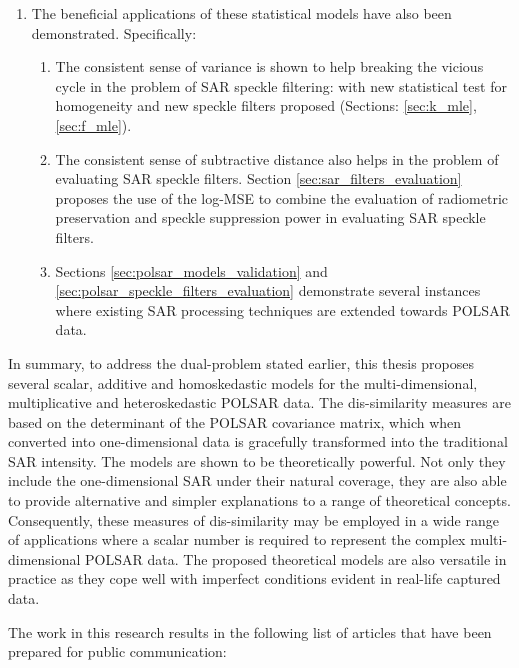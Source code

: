 \begin{enumerate}
\item The beneficial applications of these
                statistical models have also been demonstrated. Specifically:
                \begin{enumerate}
                \item The consistent sense of variance
                is shown to help breaking the vicious cycle in the problem of SAR
                speckle filtering: with new statistical test for
                homogeneity and new speckle filters proposed (Sections: \ref{sec:k_mle}, \ref{sec:f_mle}).
                \item The consistent sense of subtractive
                distance also helps in the problem of evaluating SAR
                speckle filters. Section \ref{sec:sar_filters_evaluation} proposes the use of the log-MSE to combine the
                evaluation of radiometric preservation and speckle
                suppression power in evaluating SAR speckle filters.
                \item  Sections \ref{sec:polsar_models_validation} and \ref{sec:polsar_speckle_filters_evaluation} demonstrate several instances where existing SAR
                processing techniques are extended towards POLSAR data.
                \end{enumerate}
\end{enumerate}

In summary, to address the dual-problem stated earlier, this thesis proposes several
scalar, additive and homoskedastic models for the multi-dimensional, multiplicative
and heteroskedastic POLSAR data. 
The dis-similarity measures are based on the determinant of the POLSAR covariance matrix,
  which when converted into one-dimensional data
  is gracefully transformed into the traditional SAR intensity.
The models are shown to be theoretically powerful.
Not only they include the one-dimensional SAR under their natural coverage, 
they are also able to provide alternative and simpler explanations to a range of theoretical concepts. 
Consequently, these measures of dis-similarity may be employed in a wide range of applications
  where a scalar number is required to represent the complex multi-dimensional POLSAR data.
The proposed theoretical models are also versatile in practice
  as they cope well with imperfect conditions evident in real-life captured data.

The work in this research results in the following list of articles that have been prepared for public communication: 

